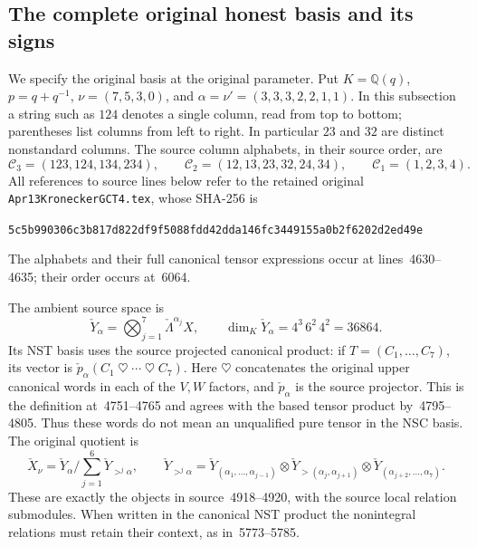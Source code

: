 \subsection{The complete original honest basis and its signs}
\label{fullbasis:enumeration}

We specify the original basis at the original parameter.  Put
$K=\mathbb Q(q)$, $p=q+q^{-1}$, $\nu=(7,5,3,0)$, and
$\alpha=\nu'=(3,3,3,2,2,1,1)$.  In this subsection a string such as
$124$ denotes a single column, read from top to bottom; parentheses list
columns from left to right.  In particular $23$ and $32$ are distinct
nonstandard columns.  The source column alphabets, in their source order,
are
\[
\mathcal C_3=(123,124,134,234),\qquad
\mathcal C_2=(12,13,23,32,24,34),\qquad
\mathcal C_1=(1,2,3,4).
\]
All references to source lines below refer to the retained original
\texttt{Apr13KroneckerGCT4.tex}, whose SHA-256 is
\begin{center}\small
\texttt{5c5b990306c3b817d822df9f5088fdd42dda146fc3449155a0b2f6202d2ed49e}
\end{center}
The alphabets and their full canonical tensor expressions occur at
lines~4630--4635; their order occurs at~6064.

The ambient source space is
\[
\check Y_\alpha=
 \bigotimes_{j=1}^{7}\check\Lambda^{\alpha_j}X,
\qquad \dim_K\check Y_\alpha=4^3\,6^2\,4^2=36864.
\]
Its NST basis uses the source projected canonical product: if
$T=(C_1,\ldots,C_7)$, its vector is
$\check p_\alpha(C_1\mathbin\heartsuit\cdots\mathbin\heartsuit C_7)$.
Here $\heartsuit$ concatenates the original upper canonical words in each
of the $V,W$ factors, and $\check p_\alpha$ is the source projector.
This is the definition at~4751--4765 and agrees with the based tensor
product by~4795--4805.  Thus these words do not mean an unqualified pure
tensor in the NSC basis.  The original quotient is
\[
 \check X_\nu=\check Y_\alpha/\sum_{j=1}^{6}\check Y_{>^j\alpha},
 \qquad
 \check Y_{>^j\alpha}=
 \check Y_{(\alpha_1,\ldots,\alpha_{j-1})}\otimes
 \check Y_{>(\alpha_j,\alpha_{j+1})}\otimes
 \check Y_{(\alpha_{j+2},\ldots,\alpha_7)}.
\]
These are exactly the objects in source~4918--4920, with the source local
relation submodules.  When written in the canonical NST product the
nonintegral relations must retain their context, as in~5773--5785.

